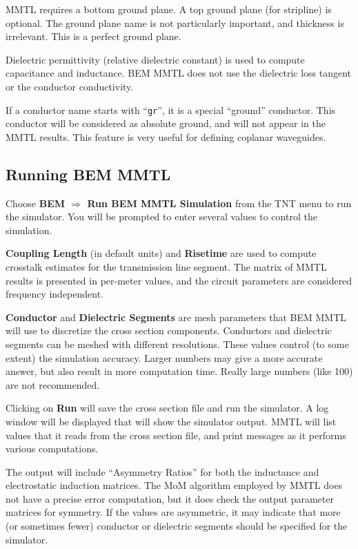 \documentclass{article}
\begin{document}
MMTL requires a bottom ground plane.  A top ground plane (for
stripline) is optional.  The ground plane name is not particularly
important, and thickness is irrelevant.  This is a perfect ground
plane.

Dielectric permittivity (relative dielectric constant) is used to
compute capacitance and inductance.  BEM MMTL does not use the
dielectric loss tangent or the conductor conductivity.

If a conductor name starts with ``{\tt gr}'', it is a special ``ground''
conductor.  This conductor will be considered as absolute ground, and
will not appear in the MMTL results.  This feature is very useful for
defining coplanar waveguides.



\subsection {Running BEM MMTL}

Choose {\bf BEM $\Rightarrow$ Run BEM MMTL Simulation} from the TNT
menu to run the simulator.  You will be prompted to enter several
values to control the simulation.

{\bf Coupling Length} (in default units) and {\bf Risetime} are used
to compute crosstalk estimates for the transmission line segment.  The
matrix of MMTL results is presented in per-meter values, and the
circuit parameters are considered frequency independent.

{\bf Conductor} and {\bf Dielectric Segments} are mesh parameters that
BEM MMTL will use to discretize the cross section components.
Conductors and dielectric segments can be meshed with different
resolutions.  These values control (to some extent) the simulation
accuracy.  Larger numbers may give a more accurate answer, but also
result in more computation time.  Really large numbers (like 100) are
not recommended.

Clicking on {\bf Run} will save the cross section file and run the
simulator.  A log window will be displayed that will show the
simulator output.  MMTL will list values that it reads from the cross
section file, and print messages as it performs various computations.

The output will include ``Asymmetry Ratios'' for both the inductance
and electrostatic induction matrices.  The MoM algorithm employed by
MMTL does not have a precise error computation, but it does check the
output parameter matrices for symmetry.  If the values are asymmetric,
it may indicate that more (or sometimes fewer) conductor or dielectric
segments should be specified for the simulator.
\end{document}
